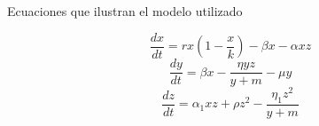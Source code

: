 \documentclass{beamer}
\date{Junio 2023}
\begin{document}
\begin{frame}{}
\end{frame}

\begin{frame}{Ecuaciones que ilustran el modelo utilizado}

    $$
        \frac{dx}{dt} = rx(1-\frac{x}{k})-\beta x-\alpha xz
    $$
    $$
        \frac{dy}{dt} = \beta x-\frac{\eta yz}{y+m}-\mu y
    $$
    $$
        \frac{dz}{dt} = \alpha_1 xz+\rho z^2-\frac{\eta_1z^2}{y+m}
    $$
\end{frame}
\end{document}
